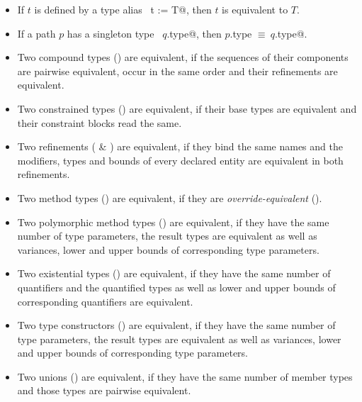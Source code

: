 \begin{itemize}
\item
If $t$ is defined by a type alias ~\lstinline@type t := T@, then $t$ is equivalent to $T$. 

\item
If a path $p$ has a singleton type ~\lstinline@$q$.type@, then \lstinline@$p$.type $\equiv\ q$.type@. 

\item
Two compound types () are equivalent, if the sequences of their components are pairwise equivalent, occur in the same order and their refinements are equivalent.

\item
Two constrained types () are equivalent, if their base types are equivalent and their constraint blocks read the same. 

\item
Two refinements ( \& ) are equivalent, if they bind the same names and the modifiers, types and bounds of every declared entity are equivalent in both refinements. 

\item
Two method types () are equivalent, if they are {\em override-equivalent} ().

\item
Two polymorphic method types () are equivalent, if they have the same number of type parameters, the result types are equivalent as well as variances, lower and upper bounds of corresponding type parameters. 

\item
Two existential types () are equivalent, if they have the same number of quantifiers and the quantified types as well as lower and upper bounds of corresponding quantifiers are equivalent. 

\item
Two type constructors () are equivalent, if they have the same number of type parameters, the result types are equivalent as well as variances, lower and upper bounds of corresponding type parameters. 

\item 
Two unions () are equivalent, if they have the same number of member types and those types are pairwise equivalent. 

\end{itemize}






